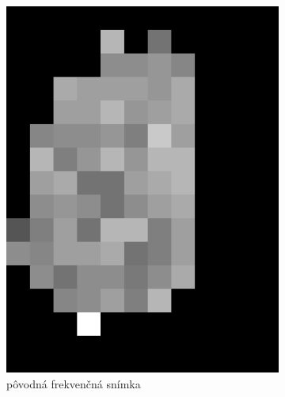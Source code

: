   \begin{figure}[h]
    \centering
    \begin{subfigure}[b]{0.3\linewidth}
      \includegraphics[width=\linewidth]{obrazky-figures/freqim.png}
      \caption{pôvodná frekvenčná snímka}
    \end{subfigure}
    \hspace{0.05\linewidth}
    \begin{subfigure}[b]{0.3\linewidth}

\end{subfigure}
\end{figure}
